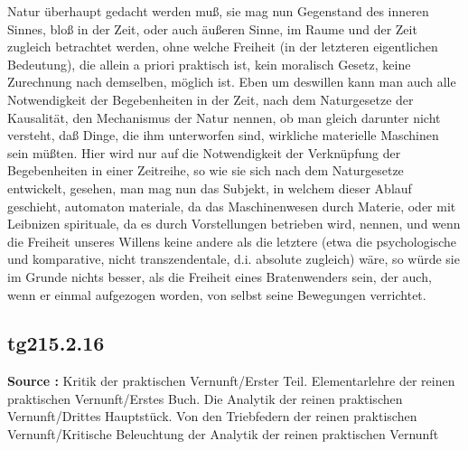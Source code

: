 \documentclass[a4paper,12pt,twoside]{book}
\begin{document}
Natur überhaupt gedacht werden muß, sie mag nun Gegenstand des inneren Sinnes, bloß in der Zeit, oder auch äußeren Sinne, im Raume und der Zeit zugleich betrachtet werden, ohne welche Freiheit (in der letzteren eigentlichen Bedeutung), die allein a priori praktisch ist, kein moralisch Gesetz, keine Zurechnung nach demselben, möglich ist. Eben um deswillen kann man auch alle Notwendigkeit der Begebenheiten in der Zeit, nach dem Naturgesetze der Kausalität, den Mechanismus der Natur nennen, ob man gleich darunter nicht versteht, daß Dinge, die ihm unterworfen sind, wirkliche materielle Maschinen sein müßten. Hier wird nur auf die Notwendigkeit der Verknüpfung der Begebenheiten in einer Zeitreihe, so wie sie sich nach dem Naturgesetze entwickelt, gesehen, man mag nun das Subjekt, in welchem dieser Ablauf geschieht, automaton materiale, da das Maschinenwesen durch Materie, oder mit Leibnizen spirituale, da es durch Vorstellungen betrieben wird, nennen, und wenn die Freiheit unseres Willens keine andere als die letztere (etwa die psychologische und komparative, nicht transzendentale, d.i. absolute zugleich) wäre, so würde sie im Grunde nichts besser, als die Freiheit eines Bratenwenders sein, der auch, wenn er einmal aufgezogen worden, von selbst seine Bewegungen verrichtet. 
	
	\subsection*{tg215.2.16} 
	\textbf{Source : }Kritik der praktischen Vernunft/Erster Teil. Elementarlehre der reinen praktischen Vernunft/Erstes Buch. Die Analytik der reinen praktischen Vernunft/Drittes Hauptstück. Von den Triebfedern der reinen praktischen Vernunft/Kritische Beleuchtung der Analytik der reinen praktischen Vernunft\\  
	
\end{document}
